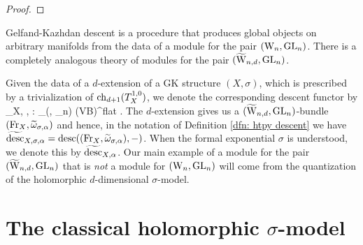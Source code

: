\documentclass[10pt]{amsart}
\begin{document}
\begin{proof}
\end{proof}

Gelfand-Kazhdan descent is a procedure that produces global objects on arbitrary manifolds from the data of a module for the pair $({{\rm W}_n}, {\rm GL}_n)$. 
There is a completely analogous theory of modules for the pair $(\widetilde{\rm W}_{n,d}, {\rm GL}_n)$. 

Given the data of a $d$-extension of a GK structure $(X, \sigma)$, which is prescribed by a trivialization of ${\rm ch}_{d+1}(T_X^{1,0})$, we denote the corresponding descent functor by
\ben
\Tilde{\desc}_{X, \sigma, \alpha} : \Mod_{(\TVectd, \GL_n)} (VB)^{flat} .
\een
The $d$-extension gives us a $(\widetilde{\rm W}_{n,d},{\rm GL}_n)$-bundle $({\rm Fr}_X, \widetilde{\omega}_{\sigma,\alpha})$ and hence, in the notation of Definition \ref{dfn: htpy descent} we have $\widetilde{{\rm desc}}_{X, \sigma, \alpha} = {\rm desc}(({\rm Fr}_X, \widetilde{\omega}_{\sigma, \alpha}), -)$.
When the formal exponential $\sigma$ is understood, we denote this by $\widetilde{{\rm desc}}_{X,\alpha}$. 
Our main example of a module for the pair $(\widetilde{\rm W}_{n,d}, {\rm GL}_n)$ that is {\em not} a module for $({{\rm W}_n}, {\rm GL}_n)$ will come from the quantization of the holomorphic $d$-dimensional $\sigma$-model.

\section{The classical holomorphic $\sigma$-model}
\end{document}
